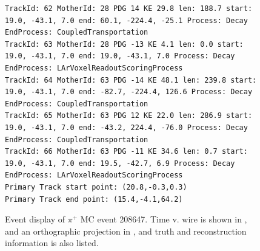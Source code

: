 \documentclass[letterpaper,12pt]{article}
\newcommand{\pip}{\ensuremath{\pi^{+}}}
\begin{document}
\begin{figure}[!hbtp]
\begin{center}
\begin{lstlisting}
TrackId: 62 MotherId: 28 PDG 14 KE 29.8 len: 188.7 start: 19.0, -43.1, 7.0 end: 60.1, -224.4, -25.1 Process: Decay EndProcess: CoupledTransportation
TrackId: 63 MotherId: 28 PDG -13 KE 4.1 len: 0.0 start: 19.0, -43.1, 7.0 end: 19.0, -43.1, 7.0 Process: Decay EndProcess: LArVoxelReadoutScoringProcess
TrackId: 64 MotherId: 63 PDG -14 KE 48.1 len: 239.8 start: 19.0, -43.1, 7.0 end: -82.7, -224.4, 126.6 Process: Decay EndProcess: CoupledTransportation
TrackId: 65 MotherId: 63 PDG 12 KE 22.0 len: 286.9 start: 19.0, -43.1, 7.0 end: -43.2, 224.4, -76.0 Process: Decay EndProcess: CoupledTransportation
TrackId: 66 MotherId: 63 PDG -11 KE 34.6 len: 0.7 start: 19.0, -43.1, 7.0 end: 19.5, -42.7, 6.9 Process: Decay EndProcess: LArVoxelReadoutScoringProcess
Primary Track start point: (20.8,-0.3,0.3)
Primary Track end point: (15.4,-4.1,64.2)
\end{lstlisting}
    \caption{%
                Event display of \pip{} MC event 208647. 
                Time v. wire is shown in , 
                and an orthographic projection in ,
                and truth and reconstruction information is also listed.
            }
    \label{fig:evd_pipMC_208647}
  \end{center}
\end{figure}

\newpage



\end{document}
